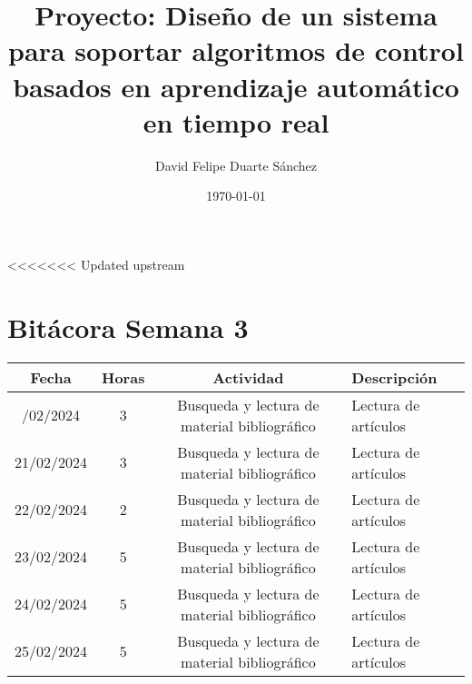 \documentclass{article}
\title{Proyecto: Diseño de un sistema para soportar algoritmos de control basados en aprendizaje automático en tiempo real}
\author{David Felipe Duarte Sánchez}
\date{\today}
\begin{document}
\maketitle
<<<<<<< Updated upstream
\section*{Bitácora Semana 3}

\begin{longtable}[c]{|c|c|c|p{6cm}|}
\hline
\textbf{Fecha} & \textbf{Horas} & \textbf{Actividad} & \textbf{Descripción} \\
\hline
\endhead
\hline
\endfoot
20/02/2024 & 3 & Busqueda y lectura de material bibliográfico & Lectura de artículos \cite{Khamis_2013} \cite{Albertos_2005} \cite{Bruzzone_2006}\\
21/02/2024 & 3 & Busqueda y lectura de material bibliográfico & Lectura de artículos \cite{Kume_2009} \cite{Hristu-Varsakelis_2007} \cite{Zhao_2021}\\
22/02/2024 & 2 & Busqueda y lectura de material bibliográfico & Lectura de artículos \cite{Kraft_1994} \cite{Auslander_1995}\\
23/02/2024 & 5 & Busqueda y lectura de material bibliográfico & Lectura de artículos \cite{Rath_2015} \cite{Gu_2004} \cite{Eriksson_2007} \cite{Fang_2011} \cite{Schmidt_2020}  \cite{8751767}\\
24/02/2024 & 5 & Busqueda y lectura de material bibliográfico & Lectura de artículos \cite{4155305} \cite{Ma2008IntegratedDA} \cite{5968809} \cite{Nelson_1994} \cite{Ma_2008}\\
25/02/2024 & 5 & Busqueda y lectura de material bibliográfico & Lectura de artículos \cite{4756316} \cite{Shao2012TheID} \cite{735019} \cite{7181866}  \cite{8242925} \\
\hline
\end{longtable}

\vspace{6cm}



\end{document}

